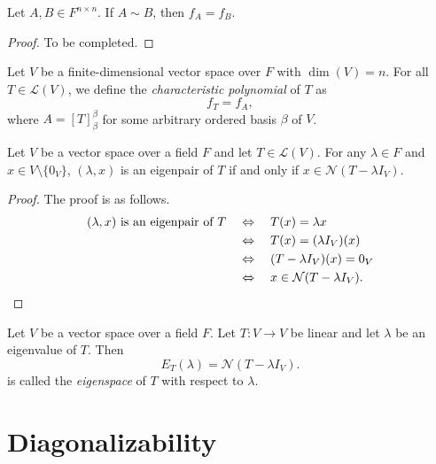 \begin{theorem}
  Let $A, B \in F^{n \times n}$. If $A \sim B$, then $f_A = f_B$.
\end{theorem}
\begin{proof}
  To be completed.
\end{proof}

\begin{definition}
  Let $V$ be a finite-dimensional vector space over $F$ with $\dim(V) = n$.
  For all $T \in \mathcal{L}(V)$, we define the
  \emph{characteristic polynomial} of $T$ as
  \begin{equation*}
    f_T = f_A,
  \end{equation*}
  where $A = [T]_\beta^\beta$ for some arbitrary ordered basis $\beta$ of $V$.
\end{definition}

\begin{theorem}
  Let $V$ be a vector space over a field $F$ and let $T \in \mathcal{L}(V)$.
  For any $\lambda \in F$ and $x \in V \setminus \{0_V\}$, $(\lambda, x)$ is
  an eigenpair of $T$ if and only if $x \in \mathcal{N}(T - \lambda I_V)$.
\end{theorem}
\begin{proof}
  The proof is as follows.
  \begin{align*}
    \text{$(\lambda, x)$ is an eigenpair of $T$}
    &\quad \Leftrightarrow \quad T(x) = \lambda x \\
    &\quad \Leftrightarrow \quad T(x) = (\lambda I_V)(x) \\
    &\quad \Leftrightarrow \quad (T - \lambda I_V)(x) = 0_V \\
    &\quad \Leftrightarrow \quad x \in \mathcal{N}(T - \lambda I_V).
    \qedhere
  \end{align*}
\end{proof}

\begin{definition}
  Let $V$ be a vector space over a field $F$.
  Let $T: V \to V$ be linear and let $\lambda$ be an eigenvalue of $T$.
  Then
  \begin{equation*}
    E_T(\lambda) = \mathcal{N}(T - \lambda I_V).
  \end{equation*}
  is called the \emph{eigenspace} of $T$ with respect to $\lambda$.
\end{definition}

\section{Diagonalizability}

